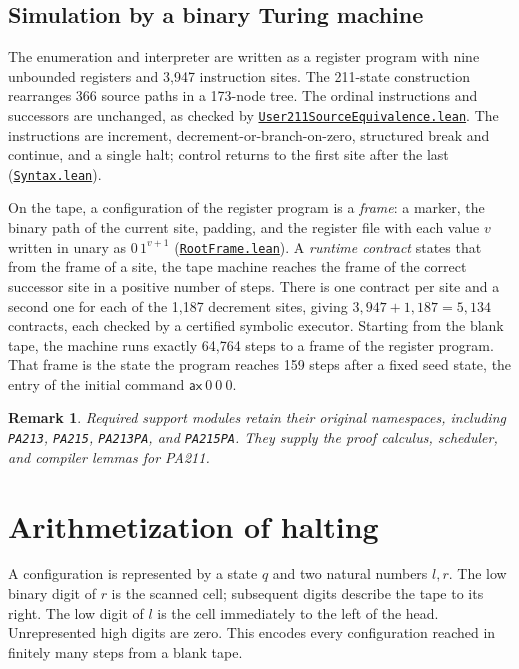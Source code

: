 \documentclass[11pt,letterpaper]{article}
\newtheorem{remark}[theorem]{Remark}
\newcommand{\src}[2]{\href{https://github.com/jamesyc/BusyBeaver/blob/main/#1}{\texttt{\nolinkurl{#2}}}}
\begin{document}
\subsection{Simulation by a binary Turing machine}

The enumeration and interpreter are written as a register program with
nine unbounded registers and 3,947 instruction sites. The 211-state
construction rearranges 366 source paths in a 173-node tree. The
ordinal instructions and successors are unchanged, as checked by
\src{Lean/User211SourceEquivalence.lean}{User211SourceEquivalence.lean}. The instructions are
increment, decrement-or-branch-on-zero, structured break and continue,
and a single halt; control returns to the first site after the last
(\src{Lean/PA215/Source/Syntax.lean}{Syntax.lean}).

On the tape, a configuration of the register program is a \emph{frame}:
a marker, the binary path of the current site, padding, and the register
file with each value $v$ written in unary as $0\,1^{v+1}$
(\src{Lean/PA215/Source/RootFrame.lean}{RootFrame.lean}). A \emph{runtime
contract} states that from the frame of a site, the tape machine reaches
the frame of the correct successor site in a positive number of steps.
There is one contract per site and a second one for each of the 1,187
decrement sites, giving $3{,}947+1{,}187=5{,}134$ contracts, each checked
by a certified symbolic executor. Starting from the blank tape, the
machine runs exactly 64,764 steps to a frame of the register program. That
frame is the state the program reaches 159 steps after a fixed seed state,
the entry of the initial command $\mathsf{ax}\ 0\ 0\ 0$.

\begin{remark}
Required support modules retain their original namespaces, including
\texttt{PA213}, \texttt{PA215}, \texttt{PA213PA}, and \texttt{PA215PA}.
They supply the proof calculus, scheduler, and compiler lemmas for PA211.
\end{remark}

\section{Arithmetization of halting}\label{sec:encoding}

A configuration is represented by a state $q$ and two natural numbers
$l,r$. The low binary digit of $r$ is the scanned cell; subsequent digits
describe the tape to its right. The low digit of $l$ is the cell immediately
to the left of the head. Unrepresented high digits are zero. This encodes
every configuration reached in finitely many steps from a blank tape.
\end{document}
